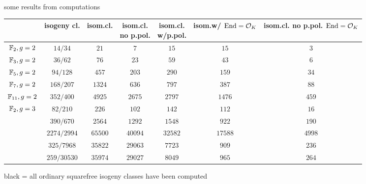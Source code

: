 \documentclass[handout]{beamer}
\begin{document}
\begin{frame}{some results from computations}{}
  {\footnotesize
  \begin{tabular}{| c | c | c | c | c | c | c |}
  \hline
		& isogeny cl.     & isom.cl.     & \parbox{3.6 em}{isom.cl.\\no p.pol.} & \parbox{3.7 em}{isom.cl.\\w/p.pol.} & \parbox{3.3 em}{isom.w/\\${\operatorname{End}={\mathcal O}_K}$} & \parbox{3.6 em}{isom.cl.\\no p.pol.\\${\operatorname{End}={\mathcal O}_K}$}\\\hline
     $\mathbb{F}_2,g=2$ & $14/34$         & $21$	  & $7$ 	       & $15$	& $15$	& $3$ \\\hline     
     $\mathbb{F}_3,g=2$ & $36/62$         & $76$	  & $23$ 	       & $59$	& $43$	& $6$\\\hline
     $\mathbb{F}_5,g=2$ & $94/128$        & $457$	  & $203$ 	       & $290$	& $159$	& $34$\\\hline
     $\mathbb{F}_7,g=2$ & $168/207$       & $1324$  	  & $636$ 	       & $797$	& $387$	& $88$\\\hline
     $\mathbb{F}_{11},g=2$ & $352/400$    & $4925$  	  & $2675$ 	       & $2797$	& $1476$& $459$\\\hline
     $\mathbb{F}_2,g=3$ & $82/210$        & $226$	  & $102$ 	       & $142$	& $112$	& $16$\\\hline
{}& $390/670$	  & $2564$  	  & $1292$	       & $1548$	& $922$	& $190$\\\hline     
{}& $2274/2994$	  & $65500$	  & $40094$ 	       & $32582$& $17588$& $4998$\\\hline     
{}& $325/7968$	  & $35822$  	  & $29063$ 	       & $7723$	& $909$	& $236$\\\hline     
{}& $259/30530$  & $35974$ 	  & $29027$	       & $8049$	& $965$	& $264$\\\hline
  \end{tabular}
  }\vspace{1 em}

  black = all ordinary squarefree isogeny classes have been computed
  
\end{frame}
\end{document}
